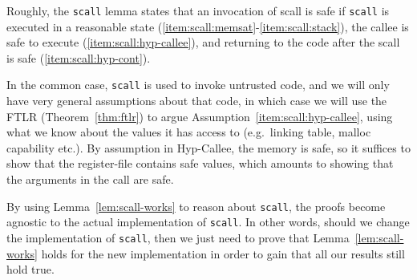 \documentclass[format=acmsmall, review=true, screen=true]{acmart}
\newenvironment{toplas}%
    {\color{OliveGreen}}{}
\begin{document}
\begin{toplas}
Roughly, the \texttt{scall} lemma states that an invocation of scall is safe if
\texttt{scall} is executed in a reasonable state
(\ref{item:scall:memsat}-\ref{item:scall:stack}), the callee is safe to execute
(\ref{item:scall:hyp-callee}), and returning to the code after the scall is safe
(\ref{item:scall:hyp-cont}).

In the common case, \texttt{scall} is used to invoke untrusted code, and we will
only have very general assumptions about that code, in which case we will use
the FTLR (Theorem~\ref{thm:ftlr}) to argue
Assumption~\ref{item:scall:hyp-callee}, using what we know about the values it
has access to (e.g.\ linking table, malloc capability etc.). By assumption in
Hyp-Callee, the memory is safe, so it suffices to show that the register-file
contains safe values, which amounts to showing that the arguments in the call
are safe.

By using Lemma~\ref{lem:scall-works} to reason about \texttt{scall}, the proofs
become agnostic to the actual implementation of \texttt{scall}. In other words,
should we change the implementation of \texttt{scall}, then we just need to
prove that Lemma~\ref{lem:scall-works} holds for the new implementation in order
to gain that all our results still hold true. 


\end{toplas}
\end{document}
